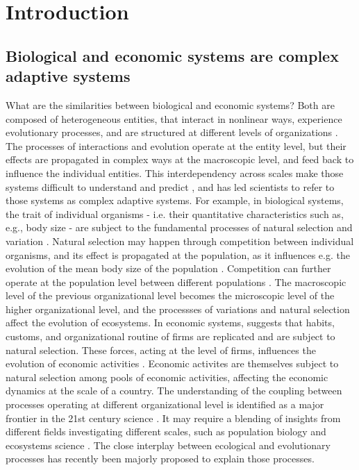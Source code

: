 %
\chapter{Introduction}
\label{sec:intro}


\section{Biological and economic systems are complex adaptive systems}
What are the similarities between biological and economic systems? Both are composed of heterogeneous entities, that interact in nonlinear ways, experience evolutionary processes, and are structured at different levels of organizations \cite{Levin}. The processes of interactions and evolution operate at the entity level, but their effects are propagated in complex ways at the macroscopic level, and feed back to influence the individual entities. This interdependency across scales make those systems difficult to understand and predict \cite{Mitchell}, and has led scientists to refer to those systems as complex adaptive systems.
% 
For example, in biological systems, the trait of individual organisms - i.e. their quantitative characteristics such as, e.g., body size - are subject to the fundamental processes of natural selection and variation \cite{mayr1999systematics}. Natural selection may happen through competition between individual organisms, and its effect is propagated at the population, as it influences e.g. the evolution of the mean body size of the population \cite{XXX}.
% 
Competition can further operate at the population level between different populations \cite{XXX}. The macroscopic level of the previous organizational level becomes the microscopic level of the higher organizational level, and the processses of variations and natural selection affect the evolution of ecosystems.
In economic systems, \cite{nelson1985evolutionary} suggests that habits, customs, and organizational routine of firms are replicated and are subject to natural selection. These forces, acting at the level of firms, influences the evolution of economic activities \cite{Hodgson2019}. Economic activites are themselves subject to natural selection among pools of economic activities, affecting the economic dynamics at the scale of a country.
The understanding of the coupling between processes operating at different organizational level is identified as a major frontier in the 21st century science \cite{Strogatz2001a}. It may require a blending of insights from different fields investigating different scales, such as population biology and ecosystems science \cite{Levin1998}. The close interplay between ecological and evolutionary processes has recently been majorly proposed to explain those processes.



